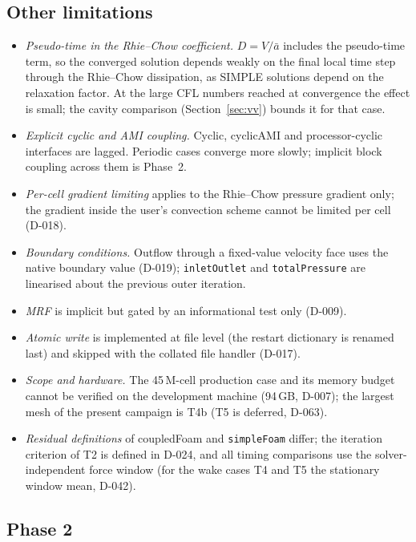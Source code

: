 \documentclass[11pt,a4paper]{article}
\newcommand{\code}[1]{\texttt{#1}}
\begin{document}
\subsection{Other limitations}

\begin{itemize}
\item \emph{Pseudo-time in the Rhie--Chow coefficient.} $D=V/\bar a$ includes
  the pseudo-time term, so the converged solution depends weakly on the
  final local time step through the Rhie--Chow dissipation, as SIMPLE
  solutions depend on the relaxation factor. At the large CFL numbers
  reached at convergence the effect is small; the cavity comparison
  (Section~\ref{sec:vv}) bounds it for that case.
\item \emph{Explicit cyclic and AMI coupling.} Cyclic, cyclicAMI and
  processor-cyclic interfaces are lagged. Periodic cases converge more
  slowly; implicit block coupling across them is Phase~2.
\item \emph{Per-cell gradient limiting} applies to the Rhie--Chow pressure
  gradient only; the gradient inside the user's convection scheme cannot be
  limited per cell (D-018).
\item \emph{Boundary conditions.} Outflow through a fixed-value velocity face
  uses the native boundary value (D-019); \code{inletOutlet} and
  \code{totalPressure} are linearised about the previous outer iteration.
\item \emph{MRF} is implicit but gated by an informational test only
  (D-009).
\item \emph{Atomic write} is implemented at file level (the restart
  dictionary is renamed last) and skipped with the collated file handler
  (D-017).
\item \emph{Scope and hardware.} The 45\,M-cell production case and its
  memory budget cannot be verified on the development machine (94\,GB, D-007);
  the largest mesh of the present campaign is T4b (T5 is deferred, D-063).
\item \emph{Residual definitions} of coupledFoam and \code{simpleFoam} differ;
  the iteration criterion of T2 is defined in D-024, and all timing
  comparisons use the solver-independent force window (for the wake cases
  T4 and T5 the stationary window mean, D-042).
\end{itemize}

\subsection{Phase 2}
\end{document}
